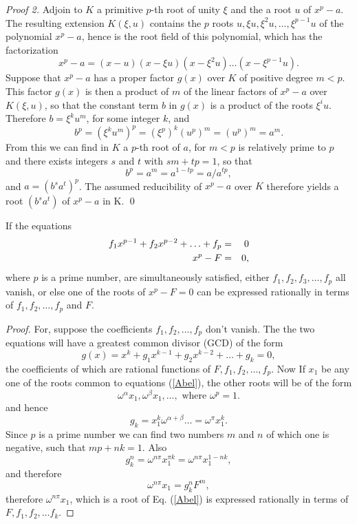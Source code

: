 \begin{proof}[Proof 2]
Adjoin to $K$ a primitive $p$-th root of unity $\xi$ and the a root $u$ of $x^p - a$. The resulting extension $K(\xi, u)$ contains the $p$ roots 
$u, \xi u, \xi^2 u, \hdots, \xi^{p-1} u$ of the polynomial $x^p - a$, hence is the root field of this polynomial, which has the factorization
\[ x^p - a = (x-u)(x-\xi u)(x - \xi^2 u) \hdots (x-\xi^{p-1} u). \]
Suppose that $x^p -a$ has a proper factor $g(x)$ over $K$ of positive degree $m < p$. This factor $g(x)$ is then a product of $m$ of the linear factors of $x^p - a$ over $K(\xi,u)$, 
so that the constant term $b$ in $g(x)$ is a product of the roots $\xi^i u$. Therefore $b = \xi^k u^m$, for some integer $k$, and 
\[ b^p = (\xi^k u^m)^p = (\xi^p)^k (u^p)^m = (u^p)^m = a^m. \]
From this we can find in $K$ a $p$-th root of $a$, for $m<p$ is relatively prime to $p$ and there exists integers $s$ and $t$ with $sm + tp = 1$, so that  
\[ b^p = a^m = a^{1 -tp} = a/a^{tp}, \]
and
$a = (b^s a^t)^p$. The assumed reducibility of $x^p -a$ over $K$ therefore yields a root $(b^s a^t)$ of $x^p - a$ in K. \qed
\end{proof}

\begin{theorem}
If the equations 
\begin{eqnarray}
f_1 x^{p-1} + f_2 x^{p-2} + \hdots + f_p &=& 0 \cr
x^p - F &=& 0,\label{Abel}
\end{eqnarray}
where $p$ is a prime number, are simultaneously satisfied, either $f_1, f_2, f_3, \hdots, f_p$ all vanish, or else one of the roots of $x^p - F = 0$ can be expressed rationally in terms of $f_1, f_2, \hdots, f_p$ and $F$.
\end{theorem}

\begin{proof}
For, suppose the coefficients $f_1, f_2, \hdots, f_p$ don't vanish. 
The the two equations will have a greatest common divisor (GCD) of the form
\[ g(x) = x^k + g_1 x^{k - 1} + g_2 x^{k - 2} + \hdots + g_k = 0, \]the coefficients of which are 
rational functions of $F, f_1, f_2, \hdots, f_p$.
Now If $x_1$ be any one of the roots common to equations (\ref{Abel}), the other roots will be of the form 
\[ \omega^\alpha x_1, \omega^\beta x_1, \dots, \mbox{  where } \omega^p =  1. \] and hence
\[ g_k = x_1^k \omega^{\alpha + \beta} \hdots = \omega^\pi x_1^k.\]
Since $p$ is a prime number we can find two numbers $m$ and $n$ of which one is negative, such that $mp + nk = 1$. Also 
\[ g_k^n = \omega^{n\pi} x_1^{\pi k} = \omega^{n\pi} x_1^{1-nk},\] and therefore
\[ \omega^{n\pi} x_1 = g_k^n F^m,\] therefore 
$ \omega^{n\pi} x_1$, which is a root of Eq. (\ref{Abel}) is expressed rationally in terms of $F, f_1, f_2, \hdots f_k$. 
\end{proof}